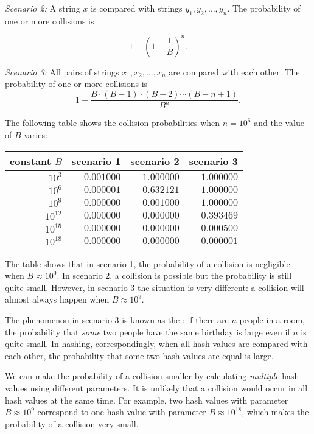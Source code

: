 \textit{Scenario 2:} A string $x$ is compared with strings
$y_1,y_2,\ldots,y_n$.
The probability of one or more collisions is

\[1-(1-\frac{1}{B})^n.\]

\textit{Scenario 3:} All pairs of strings $x_1,x_2,\ldots,x_n$
are compared with each other.
The probability of one or more collisions is
\[ 1 - \frac{B \cdot (B-1) \cdot (B-2) \cdots (B-n+1)}{B^n}.\]

The following table shows the collision probabilities
when $n=10^6$ and the value of $B$ varies:

\begin{center}
\begin{tabular}{rrrr}
constant $B$ & scenario 1 & scenario 2 & scenario 3 \\
\hline
$10^3$ & $0.001000$ & $1.000000$ & $1.000000$ \\
$10^6$ & $0.000001$ & $0.632121$ & $1.000000$ \\
$10^9$ & $0.000000$ & $0.001000$ & $1.000000$ \\
$10^{12}$ & $0.000000$ & $0.000000$ & $0.393469$ \\
$10^{15}$ & $0.000000$ & $0.000000$ & $0.000500$ \\
$10^{18}$ & $0.000000$ & $0.000000$ & $0.000001$ \\
\end{tabular}
\end{center}

The table shows that in scenario 1,
the probability of a collision is negligible
when $B \approx 10^9$.
In scenario 2, a collision is possible but the
probability is still quite small.
However, in scenario 3 the situation is very different:
a collision will almost always happen when
$B \approx 10^9$.


The phenomenon in scenario 3 is known as the
: if there are $n$ people
in a room, the probability that \emph{some} two people
have the same birthday is large even if $n$ is quite small.
In hashing, correspondingly, when all hash values are compared
with each other, the probability that some two
hash values are equal is large.

We can make the probability of a collision
smaller by calculating \emph{multiple} hash values
using different parameters.
It is unlikely that a collision would occur
in all hash values at the same time.
For example, two hash values with parameter
$B \approx 10^9$ correspond to one hash
value with parameter $B \approx 10^{18}$,
which makes the probability of a collision very small.

